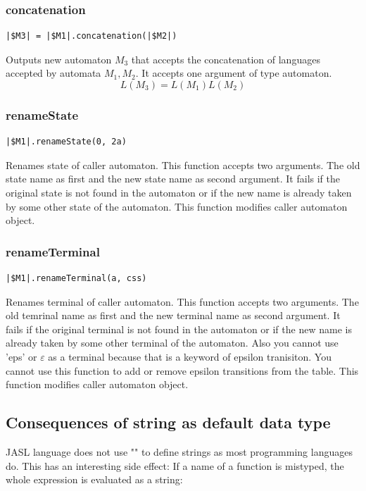 \documentclass{ctuthesis}
\begin{document}
\subsubsection{concatenation}
\begin{lstlisting}[language = JASL_snippet]
	|$M3| = |$M1|.concatenation(|$M2|)
\end{lstlisting}

Outputs new automaton $M_3$ that accepts the concatenation of languages accepted by automata $M_1, M_2$. It accepts one argument of type automaton.
\begin{equation*}
	L(M_3) = L(M_1)L(M_2)
\end{equation*}


\subsubsection{renameState}
\begin{lstlisting}[language = JASL_snippet]
	|$M1|.renameState(0, 2a)
\end{lstlisting}

Renames state of caller automaton. This function accepts two arguments. The old state name as first and the new state name as second argument. It fails if the original state is not found in the automaton or if the new name is already taken by some other state of the automaton. This function modifies caller automaton object.


\subsubsection{renameTerminal}
 \begin{lstlisting}[language = JASL_snippet]
	|$M1|.renameTerminal(a, css)
\end{lstlisting}

Renames terminal of caller automaton. This function accepts two arguments. The old temrinal name as first and the new terminal name as second argument. It fails if the original terminal is not found in the automaton or if the new name is already taken by some other terminal of the automaton. Also you cannot use 'eps' or $\varepsilon$ as a terminal because that is a keyword of epsilon tranisiton. You cannot use this function to add or remove epsilon transitions from the table. This function modifies caller automaton object.

\subsection{Consequences of string as default data type}
JASL language does not use "" to define strings as most programming languages do. This has an interesting side effect: If a name of a function is mistyped, the whole expression is evaluated as a string:
\end{document}

